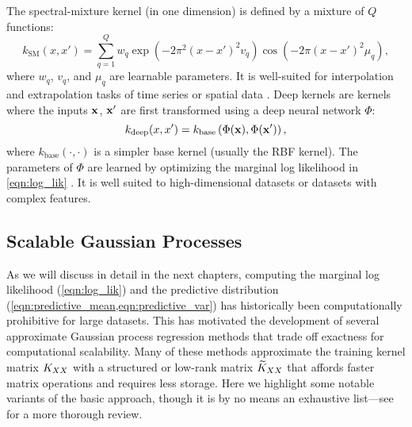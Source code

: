 The spectral-mixture kernel (in one dimension) is defined by a mixture of $Q$ functions:
%
\[
  k_\text{SM} (x, x') = \sum_{q=1}^Q w_q
    \exp \left( -2 \pi^2 (x - x')^2 v_q \right)
    \cos \left( -2 \pi (x - x')^2 \mu_q \right),
\]
%
where $w_q$, $v_q$, and $\mu_q$ are learnable parameters.
It is well-suited for interpolation and extrapolation tasks of time series or spatial data \cite{wilson2013gaussian}.
Deep kernels \cite{wilson2016deep,wilson2016stochastic,calandra2016manifold} are kernels where the inputs $\mathbf{x}$, $\mathbf{x}'$ are first transformed using a deep neural network $\Phi$:
%
\[
  k_\text{deep} (x, x') = k_\text{base} \left( \Phi(\mathbf{x}), \Phi(\mathbf{x}') \right),
\]
where $k_\text{base}(\cdot, \cdot)$ is a simpler base kernel (usually the RBF kernel).
The parameters of $\Phi$ are learned by optimizing the marginal log likelihood in \cref{eqn:log_lik} \cite{wilson2016deep}.
It is well suited to high-dimensional datasets or datasets with complex features.







\subsection{Scalable Gaussian Processes}
\label{sec:approx_gps}

As we will discuss in detail in the next chapters, computing the marginal log likelihood (\cref{eqn:log_lik}) and the predictive distribution (\cref{eqn:predictive_mean,eqn:predictive_var}) has historically been computationally prohibitive for large datasets.
This has motivated the development of several approximate Gaussian process regression methods \citep[e.g.][]{quinonero2005unifying,snelson2006sparse,rahimi2008random,titsias2009variational,hensman2013gaussian,wilson2015kernel,izmailov2018scalable,gardner2018product,evans2018scalable} that trade off exactness for computational scalability.
Many of these methods approximate the training kernel matrix $K_{XX}$ with a structured or low-rank matrix $\widetilde{K}_{XX}$ that affords faster matrix operations and requires less storage.
Here we highlight some notable variants of the basic approach, though it is by no means an exhaustive list---see \cite{liu2018gaussian} for a more thorough review.


